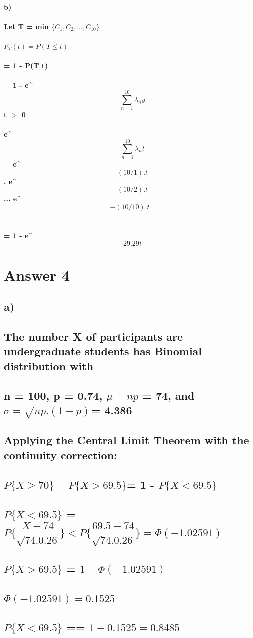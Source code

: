 \documentclass[12pt]{article}
\begin{document}
\paragraph{b)
\\\\ Let T = min $\{C_{1}, C_{2}, . . . , C_{10}\}$
\\\\ $F_{T}(t) = P(T \leq t)$
\\\\ {\hspace*{32}} = 1 - P(T \geq t)
\\\\ {\hspace*{32}}  = 1 - e^\[ -\sum_{n=1}^{10} \lambda_{n} y\] {\hspace*{50}} t $>$ 0
\\\\ e^\[ -\sum_{n=1}^{10} \lambda_{n} t\] = e^\[-(10/1) . t \]  . e^\[-(10/2) . t \]  ... e^\[-(10/10) . t \] 
\\\\ {\hspace*{32}}  =  1 -  e^\[-29.29 t \] 
}

\section*{Answer 4}
\subsection*{a)
\\\\ The number X of participants are undergraduate students has Binomial distribution with
\\\\ n = 100, p = 0.74, $\mu = np$ = 74, and $ \sigma =\sqrt{np . (1- p)} $= 4.386
\\\\ Applying the Central Limit Theorem with the continuity correction: 
\\\\ {\hspace*{50}}$P\{X \geq 70\} = P\{X > 69.5\} $= 1 - $P\{X < 69.5\}$
\\\\ {\hspace*{50}} $P\{X < 69.5\}$ = $P \{ \dfrac{X - 74}{\sqrt{74 . 0.26}}\} < P \{\dfrac{69.5-74}{\sqrt{74 . 0.26}}\} = \Phi(-1.02591)$ 
\\\\{\hspace*{50}} $P\{X > 69.5\} $ = $1 - \Phi(-1.02591)$
\\\\ {\hspace*{50}}$\Phi(-1.02591) = 0.1525 $
\\\\ {\hspace*{50}} $P\{X < 69.5\}$ == $1- 0.1525 = 0.8485 $
}
\end{document}
